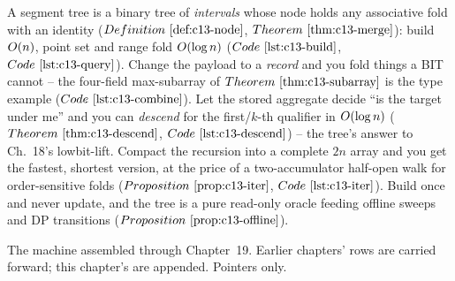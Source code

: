 \begin{recallbox}
A segment tree is a binary tree of \emph{intervals} whose node holds any associative
fold with an identity (\(\defref{c13-node}\), \(\thmref{c13-merge}\)): build
\(O(n)\), point set and range fold \(O(\log n)\) (\(\coderef{c13-build}\),
\(\coderef{c13-query}\)). Change the payload to a \emph{record} and you fold things a
BIT cannot -- the four-field max-subarray of \(\thmref{c13-subarray}\) is the type
example (\(\coderef{c13-combine}\)). Let the stored aggregate decide ``is the target
under me'' and you can \emph{descend} for the first/\(k\)-th qualifier in
\(O(\log n)\) (\(\thmref{c13-descend}\), \(\coderef{c13-descend}\)) -- the tree's
answer to Ch.~18's lowbit-lift. Compact the recursion into a complete \(2n\) array and
you get the fastest, shortest version, at the price of a two-accumulator half-open walk
for order-sensitive folds (\(\propref{c13-iter}\), \(\coderef{c13-iter}\)). Build once
and never update, and the tree is a pure read-only oracle feeding offline sweeps and
DP transitions (\(\propref{c13-offline}\)).
\end{recallbox}



The machine assembled through Chapter~19. Earlier chapters' rows are carried
forward; this chapter's are appended. Pointers only.

